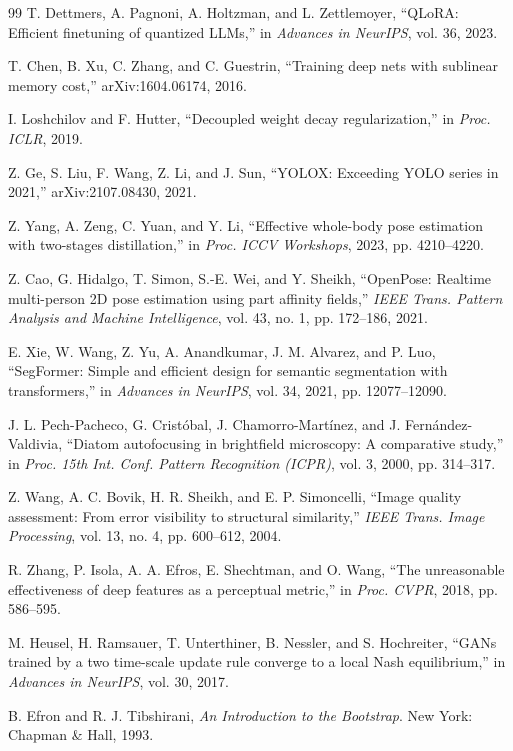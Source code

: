 \begin{thebibliography}{99}
 T. Dettmers, A. Pagnoni, A. Holtzman, and L. Zettlemoyer, ``QLoRA: Efficient finetuning of quantized LLMs,'' in \textit{Advances in NeurIPS}, vol. 36, 2023.

 T. Chen, B. Xu, C. Zhang, and C. Guestrin, ``Training deep nets with sublinear memory cost,'' arXiv:1604.06174, 2016.

 I. Loshchilov and F. Hutter, ``Decoupled weight decay regularization,'' in \textit{Proc. ICLR}, 2019.

 Z. Ge, S. Liu, F. Wang, Z. Li, and J. Sun, ``YOLOX: Exceeding YOLO series in 2021,'' arXiv:2107.08430, 2021.

 Z. Yang, A. Zeng, C. Yuan, and Y. Li, ``Effective whole-body pose estimation with two-stages distillation,'' in \textit{Proc. ICCV Workshops}, 2023, pp. 4210--4220.

 Z. Cao, G. Hidalgo, T. Simon, S.-E. Wei, and Y. Sheikh, ``OpenPose: Realtime multi-person 2D pose estimation using part affinity fields,'' \textit{IEEE Trans. Pattern Analysis and Machine Intelligence}, vol. 43, no. 1, pp. 172--186, 2021.

 E. Xie, W. Wang, Z. Yu, A. Anandkumar, J. M. Alvarez, and P. Luo, ``SegFormer: Simple and efficient design for semantic segmentation with transformers,'' in \textit{Advances in NeurIPS}, vol. 34, 2021, pp. 12077--12090.

 J. L. Pech-Pacheco, G. Cristóbal, J. Chamorro-Martínez, and J. Fernández-Valdivia, ``Diatom autofocusing in brightfield microscopy: A comparative study,'' in \textit{Proc. 15th Int. Conf. Pattern Recognition (ICPR)}, vol. 3, 2000, pp. 314--317.

 Z. Wang, A. C. Bovik, H. R. Sheikh, and E. P. Simoncelli, ``Image quality assessment: From error visibility to structural similarity,'' \textit{IEEE Trans. Image Processing}, vol. 13, no. 4, pp. 600--612, 2004.

 R. Zhang, P. Isola, A. A. Efros, E. Shechtman, and O. Wang, ``The unreasonable effectiveness of deep features as a perceptual metric,'' in \textit{Proc. CVPR}, 2018, pp. 586--595.

 M. Heusel, H. Ramsauer, T. Unterthiner, B. Nessler, and S. Hochreiter, ``GANs trained by a two time-scale update rule converge to a local Nash equilibrium,'' in \textit{Advances in NeurIPS}, vol. 30, 2017.

 B. Efron and R. J. Tibshirani, \textit{An Introduction to the Bootstrap}. New York: Chapman \& Hall, 1993.


\end{thebibliography}

